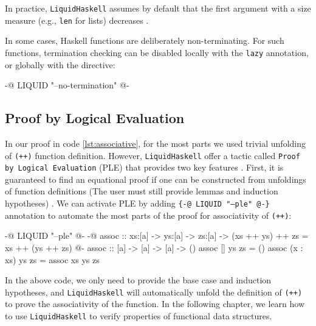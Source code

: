 In practice, \texttt{LiquidHaskell} assumes by default that the first argument with a size measure (e.g., \texttt{len} for lists) decreases \cite{vazou_liquidhaskell_2014}.

In some cases, Haskell functions are deliberately non-terminating.
For such functions, termination checking can be disabled locally with the \texttt{lazy} annotation, or globally with the directive:

\begin{code}
{-@ LIQUID "--no-termination" @-}
\end{code}

\subsection{Proof by Logical Evaluation}
In our proof in code \ref{lst:associative}, for the most parts we used trivial unfolding of \texttt{(++)} function definition.
However, \texttt{LiquidHaskell} offer a tactic called \texttt{Proof by Logical Evaluation} (PLE)
that provides two key features \cite{vazou2018}. First, it is guaranteed to find an equational proof if one can be constructed
from unfoldings of function definitions (The user must still provide lemmas and induction hypotheses) \cite{vazou2018}.
We can activate PLE by adding \texttt{\{-@ LIQUID "---ple" @-\}} annotation to automate the most parts of the proof for associativity of \texttt{(++)}:

\begin{code}
	{-@ LIQUID "--ple" @-}
	{-@ assoc :: xs:[a] -> ys:[a] -> zs:[a]
	-> { (xs ++ ys) ++ zs = xs ++ (ys ++ zs) } @-}
	assoc :: [a] -> [a] -> [a] -> ()
	assoc [] ys zs = ()
	assoc (x : xs) ys zs = assoc xs ys zs
\end{code}

In the above code, we only need to provide the base case and induction hypotheses, and
\texttt{LiquidHaskell} will automatically unfold the definition of \texttt{(++)} to prove the associativity of the function.
In the following chapter, we learn how to use \texttt{LiquidHaskell} to verify properties of functional data structures.
